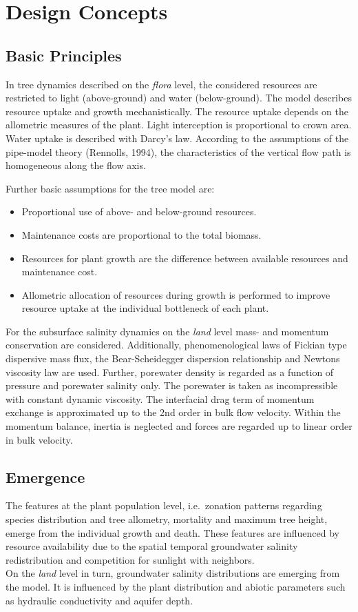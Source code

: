 \documentclass[manusscript, 12p, authoryear]{elsarticle}
\begin{document}
\section{Design Concepts}
\subsection{Basic Principles}
In tree dynamics described on the \textit{flora} level, the considered resources are restricted to light (above-ground) and water (below-ground).
The model describes resource uptake and growth mechanistically.
The resource uptake depends on the allometric measures of the plant.
Light interception is proportional to crown area.
Water uptake is described with Darcy’s law.
According to the assumptions of the pipe-model theory (Rennolls, 1994), the characteristics of the vertical flow path is homogeneous along the flow axis.

Further basic assumptions for the tree model are:
\begin{itemize}
\item Proportional use of above- and below-ground resources.
\item Maintenance costs are proportional to the total biomass.
\item Resources for plant growth are the difference between available resources and maintenance cost.
\item Allometric allocation of resources during growth is performed to improve resource uptake at the individual bottleneck of each plant.
\end{itemize}
For the subsurface salinity dynamics on the \textit{land} level mass- and momentum conservation are considered.
Additionally, phenomenological laws of Fickian type dispersive mass flux, the Bear-Scheidegger dispersion relationship and Newtons viscosity law are used.
Further, porewater density is regarded as a function of pressure and porewater salinity only.
The porewater is taken as incompressible with constant dynamic viscosity.
The interfacial drag term of momentum exchange is approximated up to the 2nd order in bulk flow velocity.
Within the momentum balance, inertia is neglected and forces are regarded up to linear order in bulk velocity.
\subsection{Emergence}
The features at the plant population level, i.e.~zonation patterns regarding species distribution and tree allometry, mortality and maximum tree height, emerge from the individual growth and death.
These features are influenced by resource availability due to the spatial temporal groundwater salinity redistribution and competition for sunlight with neighbors.\\
On the \textit{land} level in turn, groundwater salinity distributions are emerging from the model.
It is influenced by the plant distribution and abiotic parameters such as hydraulic conductivity and aquifer depth.
\end{document}
